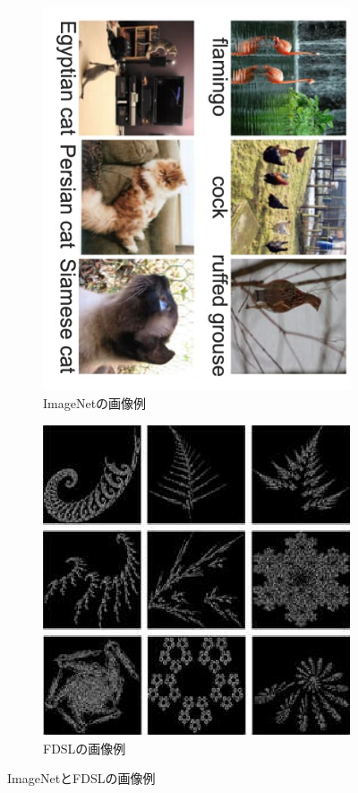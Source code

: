 \begin{figure}[tbp]
  \centering
  \begin{subfigure}[b]{0.45\linewidth}
    \centering
    \includegraphics[height=0.9\linewidth, keepaspectratio]{image/imagenet.png}
    \caption{ImageNetの画像例}
    \label{fig:imagenet}
  \end{subfigure}
  \hfill
  \begin{subfigure}[b]{0.45\linewidth}
    \centering
    \includegraphics[height=0.9\linewidth, keepaspectratio]{image/fdsl.png}
    \caption{FDSLの画像例}
    \label{fig:fdsl}
  \end{subfigure}
  \caption{ImageNetとFDSLの画像例}
  \label{fig:transfer_learning}
\end{figure}

